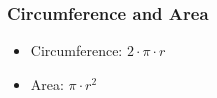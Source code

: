 \documentclass{article}
\begin{document}
        \subsubsection{Circumference and Area}
            \begin{itemize}
                \item Circumference: $2 \cdot \pi \cdot r$
                \item Area: $\pi \cdot r^2$
            \end{itemize}
            
    
\end{document}
